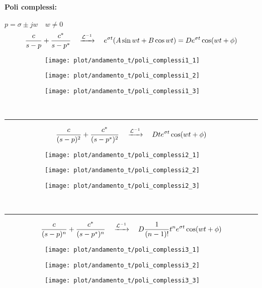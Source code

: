 \documentclass[../main.tex]{subfiles}
\begin{document}
	\paragraph{Poli complessi:} $ p = \sigma \pm jw \quad w \neq 0 $
	\[ \frac{c}{s-p} + \frac{c^*}{s-p^*}  \quad \xrightarrow{\mathcal{L}^{-1}} \quad  e^{\sigma t} (A \sin wt + B \cos wt) = D e^{\sigma t} \cos (wt + \phi)  \]
	\begin{figure}[h!]
		\centering
		\begin{subfigure}{0.3\textwidth}
			\texttt{[image: plot/andamento\_t/poli\_complessi1\_1]}
		\end{subfigure}
		\begin{subfigure}{0.3\textwidth}
			\texttt{[image: plot/andamento\_t/poli\_complessi1\_2]}
		\end{subfigure}
		\begin{subfigure}{0.3\textwidth}
			\texttt{[image: plot/andamento\_t/poli\_complessi1\_3]}
		\end{subfigure}
	\end{figure}\\
	\rule{\linewidth}{0.4pt}
	\[ \frac{c}{(s-p)^2} + \frac{c^*}{(s-p^*)^2}  \quad \xrightarrow{\mathcal{L}^{-1}} \quad  D t e^{\sigma t} \cos (wt + \phi) \]
	\begin{figure}[h!]
		\centering
		\begin{subfigure}{0.3\textwidth}
			\texttt{[image: plot/andamento\_t/poli\_complessi2\_1]}
		\end{subfigure}
		\begin{subfigure}{0.3\textwidth}
			\texttt{[image: plot/andamento\_t/poli\_complessi2\_2]}
		\end{subfigure}
		\begin{subfigure}{0.3\textwidth}
			\texttt{[image: plot/andamento\_t/poli\_complessi2\_3]}
		\end{subfigure}
	\end{figure}\\
	\rule{\linewidth}{0.4pt}
	\[ \frac{c}{(s-p)^n} + \frac{c^*}{(s-p^*)^n}  \quad \xrightarrow{\mathcal{L}^{-1}} \quad  D \frac{1}{(n-1)!} t^n e^{\sigma t} \cos (wt + \phi) \]
	\begin{figure}[h!]
		\centering
		\begin{subfigure}{0.3\textwidth}
			\texttt{[image: plot/andamento\_t/poli\_complessi3\_1]}
		\end{subfigure}
		\begin{subfigure}{0.3\textwidth}
			\texttt{[image: plot/andamento\_t/poli\_complessi3\_2]}
		\end{subfigure}
		\begin{subfigure}{0.3\textwidth}
			\texttt{[image: plot/andamento\_t/poli\_complessi3\_3]}
		\end{subfigure}
	\end{figure}
	\newpage
\end{document}
